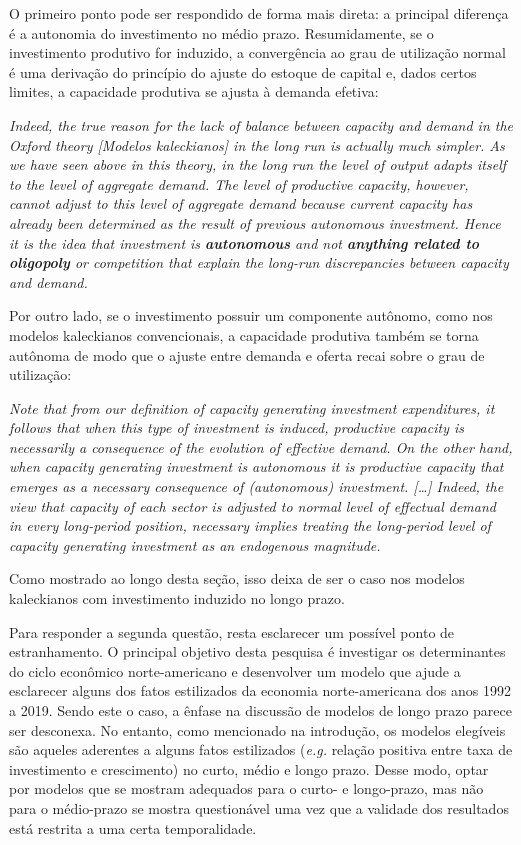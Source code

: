 O primeiro ponto pode ser respondido de forma mais direta: a principal diferença é a autonomia do investimento no médio prazo.  Resumidamente, se o investimento produtivo for induzido, a convergência ao grau de utilização normal é uma derivação do princípio do ajuste do estoque de capital e, dados certos limites, a capacidade produtiva se ajusta à demanda efetiva:

\begin{citacao}
	\textit{Indeed, the true reason for the lack of balance between capacity and demand in the Oxford theory [Modelos kaleckianos] in the long run is actually much simpler. As we have seen above in this theory, in the long run the level of output adapts itself to the level of aggregate demand. The level of productive capacity, however, cannot adjust to this level of aggregate demand because current capacity has already been determined as the result of previous autonomous investment. Hence it is the idea that investment is \textbf{autonomous} and not \textbf{anything related to oligopoly} or competition that explain the long-run discrepancies between capacity and demand.}
	\cite[p.~120, grifos adicionados]{serrano_sraffian_1995}
\end{citacao}
Por outro lado, se o investimento possuir um componente autônomo, como nos modelos kaleckianos convencionais, a capacidade produtiva também se torna autônoma de modo que o ajuste entre demanda e oferta recai sobre o grau de utilização:
\begin{citacao}
	\textit{Note that from our definition of capacity generating investment expenditures, it follows that when this type of investment is induced, productive capacity is necessarily a consequence of the evolution of effective demand. On the other hand, when capacity generating investment is autonomous it is productive capacity that emerges as a necessary consequence of (autonomous) investment. […] Indeed, the view that capacity of each sector is adjusted to normal level of effectual demand in every long-period position, necessary implies treating the long-period level of capacity generating investment as an endogenous magnitude.} \cite[p.~77]{serrano_sraffian_1995}
\end{citacao}
Como mostrado ao longo desta seção, isso deixa de ser o caso nos modelos kaleckianos com investimento induzido no longo prazo.

Para responder a segunda questão, resta esclarecer um possível ponto de estranhamento. O principal objetivo desta pesquisa é investigar os determinantes do ciclo econômico norte-americano e desenvolver um modelo que ajude a esclarecer alguns dos fatos estilizados da economia norte-americana dos anos 1992 a 2019. Sendo este o caso, a ênfase na discussão de modelos de longo prazo parece ser desconexa. 
No entanto, como mencionado na introdução, os modelos elegíveis são aqueles aderentes a alguns fatos estilizados (\textit{e.g.} relação positiva entre taxa de investimento e crescimento)  no curto, médio e longo prazo.
Desse modo, optar por modelos que se mostram adequados para o curto- e longo-prazo, mas não para o médio-prazo se mostra questionável uma vez que a validade dos resultados está restrita a uma certa temporalidade. 

